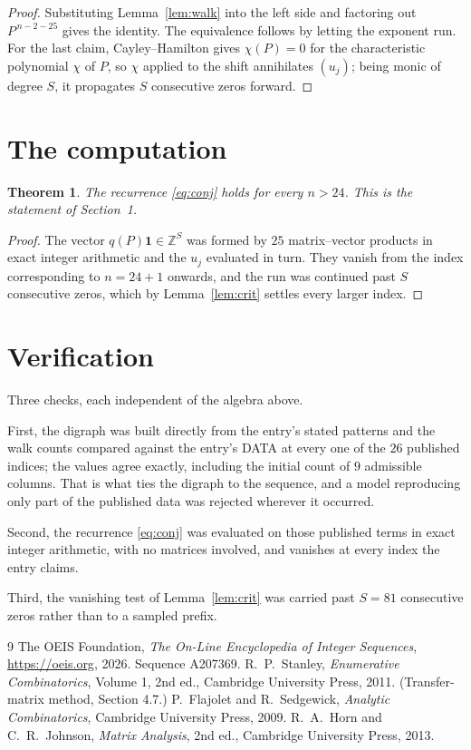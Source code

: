 \documentclass[11pt,a4paper]{article}
\theoremstyle{plain}
\newtheorem{theorem}{Theorem}
\theoremstyle{definition}
\begin{document}
\begin{proof}
Substituting Lemma~\ref{lem:walk} into the left side and factoring out
$P^{\,n-2-25}$ gives the identity. The equivalence follows by letting the exponent
run. For the last claim, Cayley--Hamilton gives $\chi(P)=0$ for the characteristic
polynomial $\chi$ of $P$, so $\chi$ applied to the shift annihilates $(u_j)$; being monic of
degree $S$, it propagates $S$ consecutive zeros forward.
\end{proof}

\section{The computation}

\begin{theorem}
The recurrence \eqref{eq:conj} holds for every $n>24$. This is the statement of
Section~1.
\end{theorem}

\begin{proof}
The vector $q(P)\mathbf{1}\in\mathbb{Z}^{S}$ was formed by $25$ matrix--vector
products in exact integer arithmetic and the $u_j$ evaluated in turn. They vanish from the
index corresponding to $n=24+1$ onwards, and the run was continued past $S$ consecutive
zeros, which by Lemma~\ref{lem:crit} settles every larger index.
\end{proof}

\section{Verification}

Three checks, each independent of the algebra above.

First, the digraph was built directly from the entry's stated patterns and the walk counts
compared against the entry's DATA at every one of the $26$ published indices; the
values agree exactly, including the initial count of $9$ admissible columns. That is
what ties the digraph to the sequence, and a model reproducing only part of the published
data was rejected wherever it occurred.

Second, the recurrence \eqref{eq:conj} was evaluated on those published terms in exact
integer arithmetic, with no matrices involved, and vanishes at every index the entry claims.

Third, the vanishing test of Lemma~\ref{lem:crit} was carried past $S=81$ consecutive
zeros rather than to a sampled prefix.

\begin{thebibliography}{9}
 The OEIS Foundation, \emph{The On-Line Encyclopedia of Integer
Sequences}, \url{https://oeis.org}, 2026. Sequence A207369.
 R.~P.~Stanley, \emph{Enumerative Combinatorics}, Volume 1, 2nd ed.,
Cambridge University Press, 2011. (Transfer-matrix method, Section 4.7.)
 P.~Flajolet and R.~Sedgewick, \emph{Analytic Combinatorics}, Cambridge
University Press, 2009.
 R.~A.~Horn and C.~R.~Johnson, \emph{Matrix Analysis}, 2nd ed., Cambridge
University Press, 2013.
\end{thebibliography}
\end{document}
